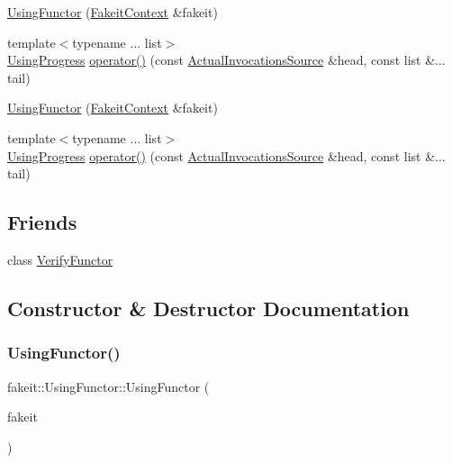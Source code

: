 \begin{DoxyCompactItemize}
\mbox{\hyperlink{classfakeit_1_1UsingFunctor_ab7ed9b94b7e7c0fe306f12a2f33d1b64}{Using\+Functor}} (\mbox{\hyperlink{structfakeit_1_1FakeitContext}{Fakeit\+Context}} \&fakeit)
\item 
{\footnotesize template$<$typename ... list$>$ }\\\mbox{\hyperlink{classfakeit_1_1UsingProgress}{Using\+Progress}} \mbox{\hyperlink{classfakeit_1_1UsingFunctor_ac93b365a3185f144cd88bb3f38864fb5}{operator()}} (const \mbox{\hyperlink{structfakeit_1_1ActualInvocationsSource}{Actual\+Invocations\+Source}} \&head, const list \&... tail)
\item 
\mbox{\hyperlink{classfakeit_1_1UsingFunctor_ab7ed9b94b7e7c0fe306f12a2f33d1b64}{Using\+Functor}} (\mbox{\hyperlink{structfakeit_1_1FakeitContext}{Fakeit\+Context}} \&fakeit)
\item 
{\footnotesize template$<$typename ... list$>$ }\\\mbox{\hyperlink{classfakeit_1_1UsingProgress}{Using\+Progress}} \mbox{\hyperlink{classfakeit_1_1UsingFunctor_ac93b365a3185f144cd88bb3f38864fb5}{operator()}} (const \mbox{\hyperlink{structfakeit_1_1ActualInvocationsSource}{Actual\+Invocations\+Source}} \&head, const list \&... tail)
\end{DoxyCompactItemize}
\subsection*{Friends}
\begin{DoxyCompactItemize}
\item 
class \mbox{\hyperlink{classfakeit_1_1UsingFunctor_a2a01b098d4a5791a5a03c1a440b1f20a}{Verify\+Functor}}
\end{DoxyCompactItemize}


\subsection{Constructor \& Destructor Documentation}
\mbox{\label{classfakeit_1_1UsingFunctor_ab7ed9b94b7e7c0fe306f12a2f33d1b64}} 
\subsubsection{\texorpdfstring{UsingFunctor()}{UsingFunctor()}\hspace{0.1cm}{\footnotesize\ttfamily [1/9]}}
{\footnotesize\ttfamily fakeit\+::\+Using\+Functor\+::\+Using\+Functor (\begin{DoxyParamCaption}\item[{\mbox{\hyperlink{structfakeit_1_1FakeitContext}{Fakeit\+Context}} \&}]{fakeit }\end{DoxyParamCaption})\hspace{0.3cm}{\ttfamily [inline]}}

